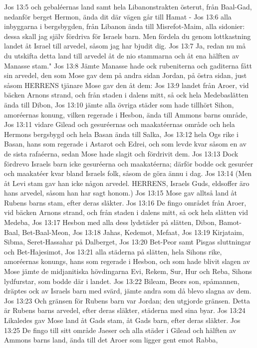Jos 13:5  och gebaléernas land samt hela Libanonstrakten österut, från Baal-Gad, nedanför berget Hermon, ända dit där vägen går till Hamat -
Jos 13:6  alla inbyggarna i bergsbygden, från Libanon ända till Misrefot-Maim, alla sidonier: dessa skall jag själv fördriva för Israels barn. Men fördela du genom lottkastning landet åt Israel till arvedel, såsom jag har bjudit dig.
Jos 13:7  Ja, redan nu må du utskifta detta land till arvedel åt de nio stammarna och åt ena hälften av Manasse stam."
Jos 13:8  Jämte Manasse hade ock rubeniterna och gaditerna fått sin arvedel, den som Mose gav dem på andra sidan Jordan, på östra sidan, just såsom HERRENS tjänare Mose gav den åt dem:
Jos 13:9  landet från Aroer, vid bäcken Arnons strand, och från staden i dalens mitt, så ock hela Medebaslätten ända till Dibon,
Jos 13:10  jämte alla övriga städer som hade tillhört Sihon, amoréernas konung, vilken regerade i Hesbon, ända till Ammons barns område,
Jos 13:11  vidare Gilead och gesuréernas och maakatéernas område och hela Hermons bergsbygd och hela Basan ända till Salka,
Jos 13:12  hela Ogs rike i Basan, hans som regerade i Astarot och Edrei, och som levde kvar såsom en av de sista rafaéerna, sedan Mose hade slagit och fördrivit dem.
Jos 13:13  Dock fördrevo Israels barn icke gesuréerna och maakatéerna; därför bodde ock gesuréer och maakatéer kvar bland Israels folk, såsom de göra ännu i dag.
Jos 13:14  (Men åt Levi stam gav han icke någon arvedel. HERRENS, Israels Guds, eldsoffer äro hans arvedel, såsom han har sagt honom.)
Jos 13:15  Mose gav alltså land åt Rubens barns stam, efter deras släkter.
Jos 13:16  De fingo området från Aroer, vid bäcken Arnons strand, och från staden i dalens mitt, så ock hela slätten vid Medeba,
Jos 13:17  Hesbon med alla dess lydstäder på slätten, Dibon, Bamot-Baal, Bet-Baal-Meon,
Jos 13:18  Jahas, Kedemot, Mefaat,
Jos 13:19  Kirjataim, Sibma, Seret-Hassahar på Dalberget,
Jos 13:20  Bet-Peor samt Pisgas sluttningar och Bet-Hajesimot,
Jos 13:21  alla städerna på slätten, hela Sihons rike, amoréernas konungs, hans som regerade i Hesbon, och som hade blivit slagen av Mose jämte de midjanitiska hövdingarna Evi, Rekem, Sur, Hur och Reba, Sihons lydfurstar, som bodde där i landet.
Jos 13:22  Bileam, Beors son, spåmannen, dräptes ock av Israels barn med svärd, jämte andra som då blevo slagna av dem.
Jos 13:23  Och gränsen för Rubens barn var Jordan; den utgjorde gränsen. Detta är Rubens barns arvedel, efter deras släkter, städerna med sina byar.
Jos 13:24  Likaledes gav Mose land åt Gads stam, åt Gads barn, efter deras släkter.
Jos 13:25  De fingo till sitt område Jaeser och alla städer i Gilead och hälften av Ammons barns land, ända till det Aroer som ligger gent emot Rabba,
